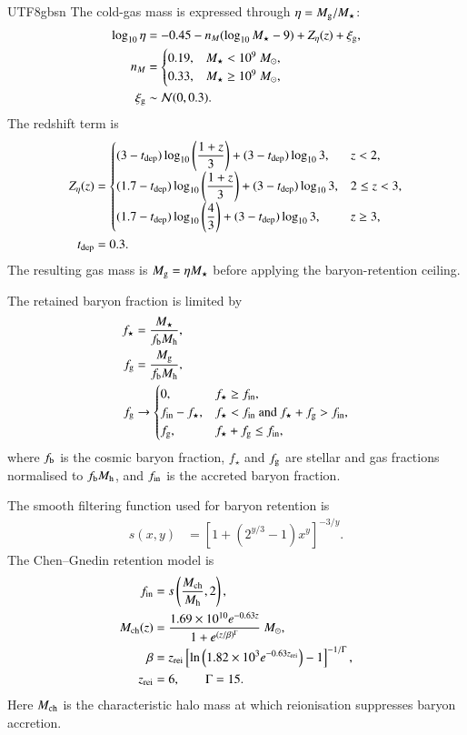 \documentclass[trackchanges, twocolappendix, twocolumn]{aastex701}
\begin{document}
\begin{CJK*}{UTF8}{gbsn}
The cold-gas mass is expressed through $\eta=M_{\rm g}/M_{\star}$:
\begin{align}
\log_{10}\eta &=
-0.45 - n_M(\log_{10}M_{\star}-9) + Z_{\eta}(z) + \xi_{\rm g},\\
n_M &=
\begin{cases}
0.19, & M_{\star}<10^9~M_\odot,\\
0.33, & M_{\star}\geq10^9~M_\odot,
\end{cases}\\
\xi_{\rm g} &\sim {\cal N}(0,0.3).
\end{align}
The redshift term is
\begin{align}
Z_{\eta}(z) &=
\begin{cases}
(3-t_{\rm dep})\log_{10}\left(\dfrac{1+z}{3}\right)
+(3-t_{\rm dep})\log_{10}3, & z<2,\\
(1.7-t_{\rm dep})\log_{10}\left(\dfrac{1+z}{3}\right)
+(3-t_{\rm dep})\log_{10}3, & 2\leq z<3,\\
(1.7-t_{\rm dep})\log_{10}\left(\dfrac{4}{3}\right)
+(3-t_{\rm dep})\log_{10}3, & z\geq3,
\end{cases}\\
t_{\rm dep} &= 0.3.
\end{align}
The resulting gas mass is $M_{\rm g}=\eta M_{\star}$ before applying the baryon-retention ceiling.

The retained baryon fraction is limited by
\begin{align}
f_{\star} &= \dfrac{M_{\star}}{f_{\rm b}M_{\rm h}},\\
f_{\rm g} &= \dfrac{M_{\rm g}}{f_{\rm b}M_{\rm h}},\\
f_{\rm g} &\rightarrow
\begin{cases}
0, & f_{\star}\geq f_{\rm in},\\
f_{\rm in}-f_{\star}, & f_{\star}<f_{\rm in}\ {\rm and}\ f_{\star}+f_{\rm g}>f_{\rm in},\\
f_{\rm g}, & f_{\star}+f_{\rm g}\leq f_{\rm in},
\end{cases}
\end{align}
where $f_{\rm b}$ is the cosmic baryon fraction, $f_{\star}$ and $f_{\rm g}$ are stellar and gas fractions normalised to $f_{\rm b}M_{\rm h}$, and $f_{\rm in}$ is the accreted baryon fraction.

The smooth filtering function used for baryon retention is
\begin{align}
s(x,y) &= \left[1+\left(2^{y/3}-1\right)x^y\right]^{-3/y}.
\end{align}
The Chen--Gnedin retention model is
\begin{align}
f_{\rm in} &= s\left(\dfrac{M_{\rm ch}}{M_{\rm h}},2\right),\\
M_{\rm ch}(z) &=
\dfrac{1.69\times10^{10}e^{-0.63z}}
{1+e^{(z/\beta)^{\Gamma}}}~M_\odot,\\
\beta &= z_{\rm rei}
\left[\ln\left(1.82\times10^3 e^{-0.63z_{\rm rei}}\right)-1\right]^{-1/\Gamma},\\
z_{\rm rei} &= 6,\qquad \Gamma=15.
\end{align}
Here $M_{\rm ch}$ is the characteristic halo mass at which reionisation suppresses baryon accretion.


\end{CJK*}
\end{document}
